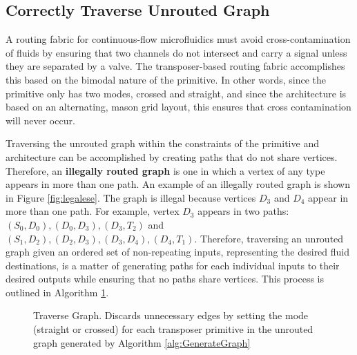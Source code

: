\subsection{Correctly Traverse Unrouted Graph}
\label{ssec:correct}
A routing fabric for continuous-flow microfluidics must avoid cross-contamination of fluids by ensuring that two channels do not intersect and carry a signal unless they are separated by a valve. The transposer-based routing fabric accomplishes this based on the bimodal nature of the primitive. In other words, since the primitive only has two modes, crossed and straight, and since the architecture is based on an alternating, mason grid layout, this ensures that cross contamination will never occur. 

Traversing the unrouted graph within the constraints of the primitive and architecture can be accomplished by creating paths that do not share vertices. Therefore, an \textbf{illegally routed graph} is one in which a vertex of any type appears in more than one path. An example of an illegally routed graph is shown in Figure \ref{fig:legalese}. The graph is illegal because vertices $D_3$ and $D_4$ appear in more than one path. For example, vertex $D_3$ appears in two paths: $(S_0, D_0),(D_0, D_3),(D_3,T_2)$ and $(S_1, D_2),(D_2, D_3),(D_3,D_4),(D_4,T_1)$. Therefore, traversing an unrouted graph given an ordered set of non-repeating inputs, representing the desired fluid destinations, is a matter of generating paths for each individual inputs to their desired outputs while ensuring that no paths share vertices. This process is outlined in Algorithm \ref{alg:Traverse}.

\begin{figure}
\begin{algorithm}[H]
\DontPrintSemicolon
{}
\caption{Traverse Graph. Discards unnecessary edges by setting the mode (straight or crossed) for each transposer primitive in the unrouted graph generated by Algorithm \ref{alg:GenerateGraph}\label{alg:Traverse}}
\end{algorithm}
\end{figure}

